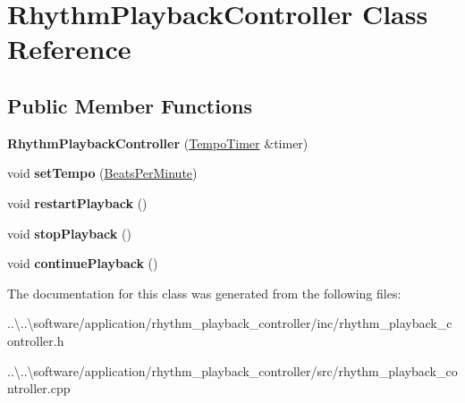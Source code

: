 \hypertarget{class_rhythm_playback_controller}{}\section{Rhythm\+Playback\+Controller Class Reference}
\label{class_rhythm_playback_controller}
\subsection*{Public Member Functions}
\begin{DoxyCompactItemize}
\item 
\mbox{\label{class_rhythm_playback_controller_a9f280da7a6477eafe98fc4fc57b02a67}} 
{\bfseries Rhythm\+Playback\+Controller} (\mbox{\hyperlink{class_tempo_timer}{Tempo\+Timer}} \&timer)
\item 
\mbox{\label{class_rhythm_playback_controller_ad61f44263753a449470b112870187060}} 
void {\bfseries set\+Tempo} (\mbox{\hyperlink{class_beats_per_minute}{Beats\+Per\+Minute}})
\item 
\mbox{\label{class_rhythm_playback_controller_ad1c705dd42b2d91fb9171996fabbe507}} 
void {\bfseries restart\+Playback} ()
\item 
\mbox{\label{class_rhythm_playback_controller_a28db76a203bc7a143e37677cdf0ea602}} 
void {\bfseries stop\+Playback} ()
\item 
\mbox{\label{class_rhythm_playback_controller_a651af2f689e72a3b3bc5e172e12a965c}} 
void {\bfseries continue\+Playback} ()
\end{DoxyCompactItemize}


The documentation for this class was generated from the following files\+:\begin{DoxyCompactItemize}
\item 
..\textbackslash{}..\textbackslash{}software/application/rhythm\+\_\+playback\+\_\+controller/inc/rhythm\+\_\+playback\+\_\+controller.\+h\item 
..\textbackslash{}..\textbackslash{}software/application/rhythm\+\_\+playback\+\_\+controller/src/rhythm\+\_\+playback\+\_\+controller.\+cpp\end{DoxyCompactItemize}

